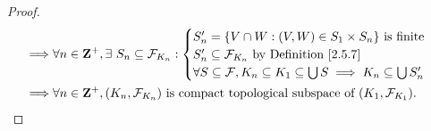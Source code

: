 \begin{proof}
\begin{align*}
        \implies & \forall n \in \mathbf{Z}^+, \exists\ S_n \subseteq \mathcal{F}_{K_n} : \begin{cases}
                                                                                              S_n' = \{V \cap W : (V, W) \in S_1 \times S_n\} \text{ is finite}  \\
                                                                                              S_n' \subseteq \mathcal{F}_{K_n} \text{ by Definition \ref{2.5.7}} \\
                                                                                              \forall S \subseteq \mathcal{F}, K_n \subseteq K_1 \subseteq \bigcup S \implies K_n \subseteq \bigcup S_n'
                                                                                          \end{cases} \\
        \implies & \forall n \in \mathbf{Z}^+, (K_n, \mathcal{F}_{K_n}) \text{ is compact topological subspace of } (K_1, \mathcal{F}_{K_1}).
    \end{align*}


\end{proof}
